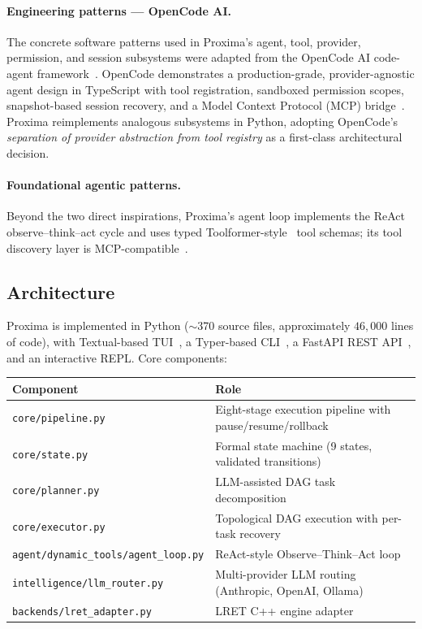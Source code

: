 \documentclass[11pt,a4paper]{article}
\begin{document}
\paragraph{Engineering patterns --- OpenCode AI.}
The concrete software patterns used in Proxima's agent, tool, provider, permission,
and session subsystems were adapted from the OpenCode AI code-agent
framework~\cite{opencode2025}. OpenCode demonstrates a production-grade,
provider-agnostic agent design in TypeScript with tool registration, sandboxed
permission scopes, snapshot-based session recovery, and a Model Context Protocol
(MCP) bridge~\cite{mcp2024}. Proxima reimplements analogous subsystems in Python,
adopting OpenCode's \emph{separation of provider abstraction from tool registry} as
a first-class architectural decision.

\paragraph{Foundational agentic patterns.}
Beyond the two direct inspirations, Proxima's agent loop implements the
ReAct~\cite{yao2023react} observe--think--act cycle and uses typed
Toolformer-style~\cite{schick2023toolformer} tool schemas; its tool discovery layer
is MCP-compatible~\cite{mcp2024}.

\subsection{Architecture}

Proxima is implemented in Python ($\sim$370 source files, approximately $46{,}000$
lines of code), with Textual-based TUI~\cite{textual}, a Typer-based
CLI~\cite{typer}, a FastAPI REST API~\cite{fastapi}, and an interactive REPL.
Core components:

\begin{center}
\renewcommand{\arraystretch}{1.2}
\begin{tabular}{@{}lp{9cm}@{}}
\toprule
\textbf{Component} & \textbf{Role} \\
\midrule
\texttt{core/pipeline.py}            & Eight-stage execution pipeline with pause/resume/rollback \\
\texttt{core/state.py}               & Formal state machine (9 states, validated transitions) \\
\texttt{core/planner.py}             & LLM-assisted DAG task decomposition \\
\texttt{core/executor.py}            & Topological DAG execution with per-task recovery \\
\texttt{agent/dynamic\_tools/agent\_loop.py} & ReAct-style Observe--Think--Act loop~\cite{yao2023react} \\
\texttt{intelligence/llm\_router.py} & Multi-provider LLM routing (Anthropic, OpenAI, Ollama) \\
\texttt{backends/lret\_adapter.py}   & LRET C++ engine adapter \\
\bottomrule
\end{tabular}
\end{center}
\end{document}
